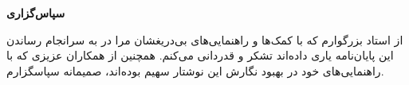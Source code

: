 
\begin{center}
{\LARGE\textbf{سپاس‌گزاری}}
\end{center}

از استاد بزرگوارم که با کمک‌ها و راهنمایی‌های بی‌دریغشان مرا در به سرانجام رساندن این پایان‌نامه یاری داده‌اند تشکر و قدردانی می‌کنم. همچنین از همکاران عزیزی که با راهنمایی‌های خود در بهبود نگارش این نوشتار سهیم بوده‌اند، صمیمانه سپاسگزارم.
